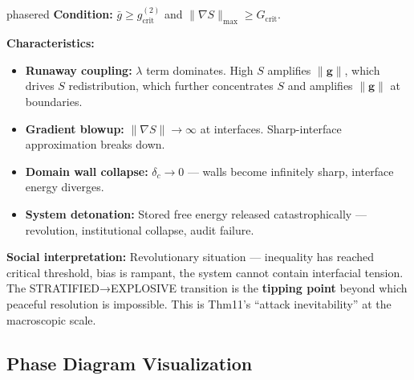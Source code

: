 \documentclass[12pt,a4paper]{article}
\theoremstyle{plain}
\theoremstyle{definition}
\newcommand{\gf}{\mathbf{g}}          %
\newcommand{\Sf}{S}                   %
\newcommand{\deltac}{\delta_c}        %
\newcommand{\gbar}{\bar{g}}           %
\begin{document}
\begin{phasebox}{phasered}
\label{phase:explosive}
\textbf{Condition:} $\gbar \ge g_{\text{crit}}^{(2)}$ and $\|\nabla\Sf\|_{\max} \ge G_{\text{crit}}$.

\textbf{Characteristics:}
\begin{itemize}
    \item \textbf{Runaway coupling:} $\lambda$ term dominates. High $\Sf$
          amplifies $\|\gf\|$, which drives $\Sf$ redistribution, which
          further concentrates $\Sf$ and amplifies $\|\gf\|$ at boundaries.
    \item \textbf{Gradient blowup:} $\|\nabla\Sf\|\to\infty$ at interfaces.
          Sharp-interface approximation breaks down.
    \item \textbf{Domain wall collapse:} $\deltac\to0$ — walls become
          infinitely sharp, interface energy diverges.
    \item \textbf{System detonation:} Stored free energy released
          catastrophically — revolution, institutional collapse, audit failure.
\end{itemize}

\textbf{Social interpretation:} Revolutionary situation — inequality has
reached critical threshold, bias is rampant, the system cannot contain
interfacial tension. The STRATIFIED→EXPLOSIVE transition is the
\textbf{tipping point} beyond which peaceful resolution is impossible.
This is Thm11's ``attack inevitability'' at the macroscopic scale.
\end{phasebox}

\subsection{Phase Diagram Visualization}
\subsection*{}
\end{document}
